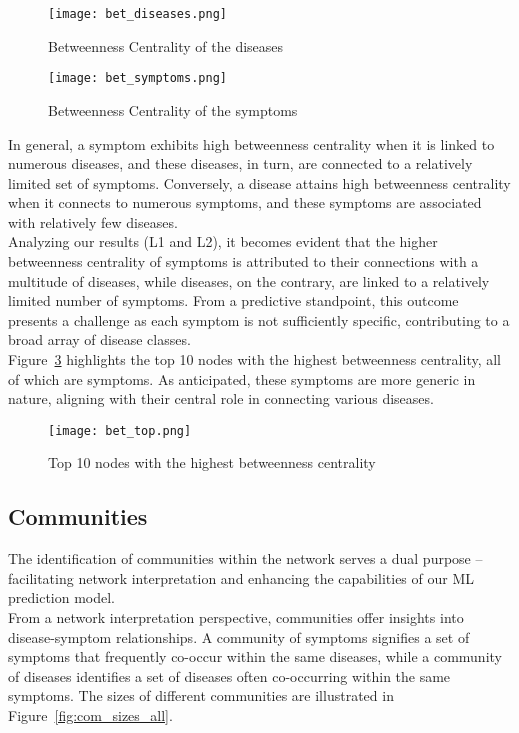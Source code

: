 \begin{figure}[H]
    \centering
    \texttt{[image: bet\_diseases.png]}
    \caption{Betweenness Centrality of the diseases}
    \label{fig:bet_diseases}
\end{figure}
\noindent
\begin{figure}[H]
    \centering
    \texttt{[image: bet\_symptoms.png]}
    \caption{Betweenness Centrality of the symptoms}
    \label{fig:bet_symptoms}
\end{figure}
\noindent
In general, a symptom exhibits high betweenness centrality when it is linked to numerous diseases, and these diseases,
in turn, are connected to a relatively limited set of symptoms. Conversely, a disease attains high betweenness centrality
when it connects to numerous symptoms, and these symptoms are associated with relatively few diseases.\\
Analyzing our results (L1 and L2), it becomes evident that the higher betweenness centrality of symptoms is attributed
to their connections with a multitude of diseases, while diseases, on the contrary, are linked to a relatively limited
number of symptoms. From a predictive standpoint, this outcome presents a challenge as each symptom is not sufficiently
specific, contributing to a broad array of disease classes.\\
Figure~\ref{fig:bet_top} highlights the top 10 nodes with the highest betweenness centrality, all of which are symptoms.
As anticipated, these symptoms are more generic in nature, aligning with their central role in connecting various diseases.

\begin{figure}[H]
    \centering
    \texttt{[image: bet\_top.png]}
    \caption{Top 10 nodes with the highest betweenness centrality}
    \label{fig:bet_top}
\end{figure}
\noindent

\subsection{Communities}

The identification of communities within the network serves a dual purpose – facilitating network interpretation
and enhancing the capabilities of our ML prediction model.\\
From a network interpretation perspective, communities offer insights into disease-symptom relationships.
A community of symptoms signifies a set of symptoms that frequently co-occur within the same diseases, while a
community of diseases identifies a set of diseases often co-occurring within the same symptoms. The sizes of
different communities are illustrated in Figure~\ref{fig:com_sizes_all}.

